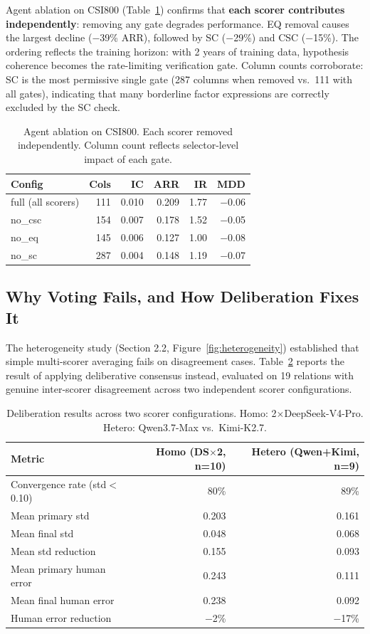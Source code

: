 \documentclass[sigconf]{acmart}
\begin{document}
Agent ablation on CSI800 (Table~\ref{tab:ablation}) confirms that \textbf{each scorer contributes independently}: removing any gate degrades performance. EQ removal causes the largest decline ($-$39\% ARR), followed by SC ($-$29\%) and CSC ($-$15\%). The ordering reflects the training horizon: with 2 years of training data, hypothesis coherence becomes the rate-limiting verification gate. Column counts corroborate: SC is the most permissive single gate (287 columns when removed vs.\ 111 with all gates), indicating that many borderline factor expressions are correctly excluded by the SC check.

\begin{table}[t]
\caption{Agent ablation on CSI800. Each scorer removed independently. Column count reflects selector-level impact of each gate.}
\label{tab:ablation}
\centering
\begin{tabular}{l r r r r r}
\toprule
Config & Cols & IC & ARR & IR & MDD \\
\midrule
full (all scorers) & 111 & 0.010 & 0.209 & 1.77 & $-$0.06 \\
no\_csc & 154 & 0.007 & 0.178 & 1.52 & $-$0.05 \\
no\_eq  & 145 & 0.006 & 0.127 & 1.00 & $-$0.08 \\
no\_sc  & 287 & 0.004 & 0.148 & 1.19 & $-$0.07 \\
\bottomrule
\end{tabular}
\end{table}

\subsection{Why Voting Fails, and How Deliberation Fixes It}

The heterogeneity study (Section 2.2, Figure~\ref{fig:heterogeneity}) established that simple multi-scorer averaging fails on disagreement cases. Table~\ref{tab:deliberation} reports the result of applying deliberative consensus instead, evaluated on 19 relations with genuine inter-scorer disagreement across two independent scorer configurations.

\begin{table}[t]
\caption{Deliberation results across two scorer configurations. Homo: 2$\times$DeepSeek-V4-Pro. Hetero: Qwen3.7-Max vs.\ Kimi-K2.7.}
\label{tab:deliberation}
\centering
\begin{tabular}{l r r}
\toprule
Metric & Homo (DS$\times$2, n=10) & Hetero (Qwen+Kimi, n=9) \\
\midrule
Convergence rate (std$<$0.10) & 80\% & 89\% \\
Mean primary std & 0.203 & 0.161 \\
Mean final std & 0.048 & 0.068 \\
Mean std reduction & 0.155 & 0.093 \\
Mean primary human error & 0.243 & 0.111 \\
Mean final human error & 0.238 & 0.092 \\
Human error reduction & $-$2\% & $-$17\% \\
\bottomrule
\end{tabular}
\end{table}
\end{document}
